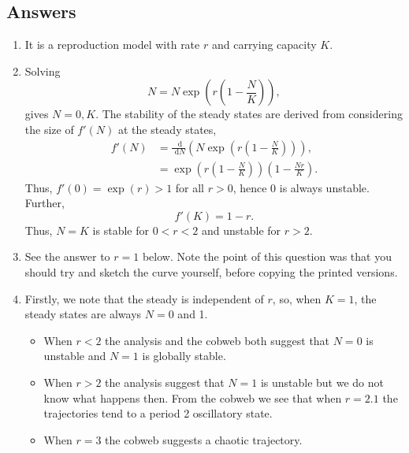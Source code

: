 \documentclass[10pt]{article}
\newcommand{\bb}{\begin{equation}}
\newcommand{\ee}{\end{equation}}
\newcommand{\rd}{\text{ d}}
\renewcommand{\l}{\left(}
\renewcommand{\r}{\right)}
\begin{document}
\begin{Answ}
\subsection{Answers}
\begin{enumerate}
\item It is a reproduction model with rate $r$ and carrying capacity $K$.
\item Solving
\bb
N=N\exp\l r\l 1-\frac{N}{K}\r\r,
\ee
gives $N=0,K$.
The stability of the steady states are derived from considering the size of $f'(N)$ at the steady states,
\begin{align}
f'(N)&=\frac{\rd}{\rd N}\l N\exp\l r\l 1-\frac{N}{K}\r\r\r,\\
&=\exp\l r\l 1-\frac{N}{K}\r\r \l 1-\frac{Nr}{K}\r.
\end{align}
Thus, $f'(0)=\exp(r)>1$ for all $r>0$, hence 0 is always unstable. Further,
\bb
f'(K)=1-r.
\ee
Thus, $N=K$ is stable for $0<r<2$ and unstable for $r>2$.
\item See the answer to $r=1$ below. Note the point of this question was that you should try and sketch the curve yourself, before copying the printed versions.


\item Firstly, we note that the steady is independent of $r$, so, when $K=1$, the steady states are always $N=0$ and 1.
\begin{itemize}
\item When $r<2$ the analysis and the cobweb both suggest that $N=0$ is unstable and $N=1$ is globally stable.

\item When $r>2$ the analysis suggest that $N=1$ is unstable but we do not know what happens then. From the cobweb we see that when $r=2.1$ the trajectories tend to a period 2 oscillatory state.

\item When $r=3$ the cobweb suggests a chaotic trajectory.


\end{itemize}


\end{enumerate}
\end{Answ}
\end{document}
